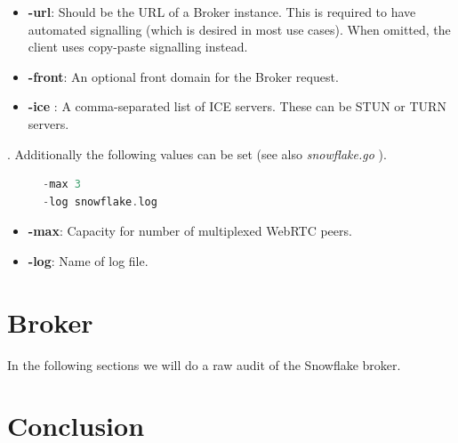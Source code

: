\documentclass{amsart}
\theoremstyle{definition}
\theoremstyle{remark}
\numberwithin{equation}{section}
\begin{document}
\begin{itemize}
    \item \textbf{-url}: Should be the URL of a Broker instance. This is required to have
automated signalling (which is desired in most use cases).
When omitted, the client uses copy-paste signalling instead.
    \item \textbf{-front}: An optional front domain for the Broker request.
    \item \textbf{-ice }: A comma-separated list of ICE servers. These can be STUN or TURN
servers.
\end{itemize}

. Additionally the following values can be set (see also \textit{snowflake.go} \cite{SnowflakeGitClient}).

\begin{figure}[H]
\begin{lstlisting}[frame=single, language=C, caption=torrc-Config: Snowflake client additional values]
-max 3
-log snowflake.log
\end{lstlisting}
\label{fig:torrcconfigsnowflakeclientadditional}
\end{figure}

\begin{itemize}
    \item \textbf{-max}: Capacity for number of multiplexed WebRTC peers.
    \item \textbf{-log}: Name of log file.
\end{itemize}
\section{Broker}
\label{s:broker}
In the following sections we will do a raw audit of the Snowflake broker.
\section{Conclusion}
\label{s:conclusion}
\nocite{*}
%


\end{document}
